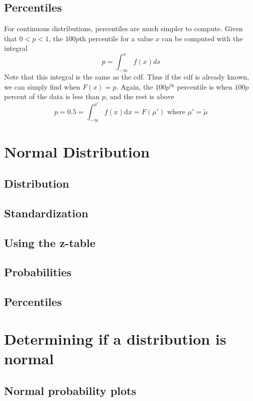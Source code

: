 \subsection{Percentiles}  %
For continuous distributions, percentiles are much simpler to compute. Given that $0<p<1$, the $100p$th percentile for a value $x$ can be computed with the integral
\begin{equation}
    p=\int_{-\infty}^{x} f(x)ds
\end{equation}
Note that this integral is the same as the cdf. Thus if the cdf is already known, we can simply find when $F(x)=p$. Again, the $100p^{\text{th}}$ percentile is when $100p$ percent of the data is less than $p$, and the rest is above\\
\begin{equation}
    p=0.5=\int_{-\infty}^{\mu'} f(x)\mathrm{d}x=F(\mu')\text{ where } \mu'=\tilde{\mu}
\end{equation}

\section{Normal Distribution}  %
\subsection{Distribution}  %
\subsection{Standardization}  %
\subsection{Using the z-table}  %
\subsection{Probabilities}  %
\subsection{Percentiles}  %

\section{Determining if a distribution is normal}  %
\subsection{Normal probability plots}  %

